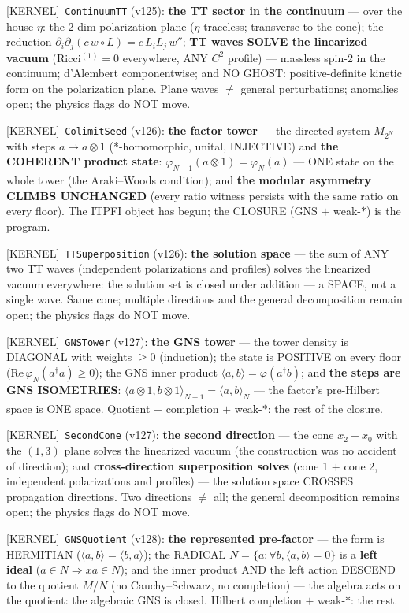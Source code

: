 \documentclass[11pt]{article}
\providecommand{\kernelmk}[1]{\textsf{[KERNEL]}~\texttt{#1}}\providecommand{\knownmk}[1]{\textsf{[KNOWN]}~{#1}}\providecommand{\statusmk}[1]{\textsf{[#1]}}
\theoremstyle{definition}\newtheorem{deriv}{Derivation}
\begin{document}
\kernelmk{ContinuumTT} (v125): \textbf{the TT sector in the continuum} --- over the house $\eta$: the 2-dim polarization plane ($\eta$-traceless; transverse to the cone); the reduction $\partial_i\partial_j(c\,w{\circ}L)=c\,L_iL_j\,w''$; \textbf{TT waves SOLVE the linearized vacuum} (Ricci$^{(1)}=0$ everywhere, ANY $C^2$ profile) --- massless spin-2 in the continuum; d'Alembert componentwise; and NO GHOST: positive-definite kinetic form on the polarization plane. Plane waves $\neq$ general perturbations; anomalies open; the physics flags do NOT move.

\kernelmk{ColimitSeed} (v126): \textbf{the factor tower} --- the directed system $M_{2^N}$ with steps $a\mapsto a\otimes 1$ (*-homomorphic, unital, INJECTIVE) and \textbf{the COHERENT product state}: $\varphi_{N+1}(a\otimes 1)=\varphi_N(a)$ --- ONE state on the whole tower (the Araki--Woods condition); and \textbf{the modular asymmetry CLIMBS UNCHANGED} (every ratio witness persists with the same ratio on every floor). The ITPFI object has begun; the CLOSURE (GNS $+$ weak-$*$) is the program.

\kernelmk{TTSuperposition} (v126): \textbf{the solution space} --- the sum of ANY two TT waves (independent polarizations and profiles) solves the linearized vacuum everywhere: the solution set is closed under addition --- a SPACE, not a single wave. Same cone; multiple directions and the general decomposition remain open; the physics flags do NOT move.

\kernelmk{GNSTower} (v127): \textbf{the GNS tower} --- the tower density is DIAGONAL with weights $\geq 0$ (induction); the state is POSITIVE on every floor ($\mathrm{Re}\,\varphi_N(a^\dagger a)\geq 0$); the GNS inner product $\langle a,b\rangle=\varphi(a^\dagger b)$; and \textbf{the steps are GNS ISOMETRIES}: $\langle a\otimes1,b\otimes1\rangle_{N+1}=\langle a,b\rangle_N$ --- the factor's pre-Hilbert space is ONE space. Quotient $+$ completion $+$ weak-$*$: the rest of the closure.

\kernelmk{SecondCone} (v127): \textbf{the second direction} --- the cone $x_2{-}x_0$ with the $(1,3)$ plane solves the linearized vacuum (the construction was no accident of direction); and \textbf{cross-direction superposition solves} (cone 1 $+$ cone 2, independent polarizations and profiles) --- the solution space CROSSES propagation directions. Two directions $\neq$ all; the general decomposition remains open; the physics flags do NOT move.

\kernelmk{GNSQuotient} (v128): \textbf{the represented pre-factor} --- the form is HERMITIAN ($\langle a,b\rangle=\overline{\langle b,a\rangle}$); the RADICAL $N=\{a:\forall b,\langle a,b\rangle=0\}$ is a \textbf{left ideal} ($a\in N\Rightarrow x a\in N$); and the inner product AND the left action DESCEND to the quotient $M/N$ (no Cauchy--Schwarz, no completion) --- the algebra acts on the quotient: the algebraic GNS is closed. Hilbert completion $+$ weak-$*$: the rest.
\end{document}
